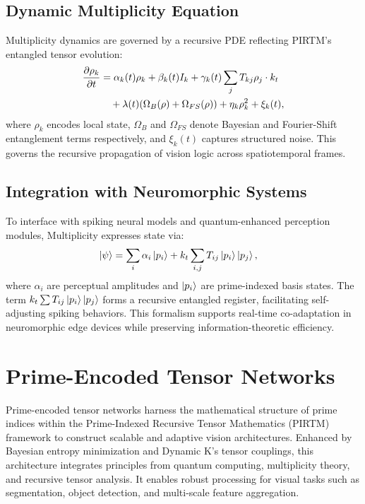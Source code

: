 \documentclass{article}
\theoremstyle{plain}
\begin{document}
\subsection{Dynamic Multiplicity Equation}
Multiplicity dynamics are governed by a recursive PDE reflecting PIRTM’s entangled tensor evolution:
\begin{align}
\frac{\partial \rho_k}{\partial t} &= \alpha_k(t) \rho_k + \beta_k(t) I_k + \gamma_k(t) \sum_j T_{kj} \rho_j \cdot k_t \notag \\
&\quad + \lambda(t)(\Omega_B(\rho) + \Omega_{FS}(\rho)) + \eta_k \rho_k^2 + \xi_k(t),
\end{align}
where \(\rho_k\) encodes local state, \(\Omega_B\) and \(\Omega_{FS}\) denote Bayesian and Fourier-Shift entanglement terms respectively, and \(\xi_k(t)\) captures structured noise. This governs the recursive propagation of vision logic across spatiotemporal frames.

\subsection{Integration with Neuromorphic Systems}
To interface with spiking neural models and quantum-enhanced perception modules, Multiplicity expresses state via:
\begin{align}
\ket{\psi} &= \sum_i \alpha_i \ket{p_i} + k_t \sum_{i,j} T_{ij} \ket{p_i} \ket{p_j},
\end{align}
where \(\alpha_i\) are perceptual amplitudes and \(\ket{p_i}\) are prime-indexed basis states. The term \(k_t \sum T_{ij} \ket{p_i} \ket{p_j}\) forms a recursive entangled register, facilitating self-adjusting spiking behaviors. This formalism supports real-time co-adaptation in neuromorphic edge devices while preserving information-theoretic efficiency.
\section{Prime-Encoded Tensor Networks}
Prime-encoded tensor networks harness the mathematical structure of prime indices within the Prime-Indexed Recursive Tensor Mathematics (PIRTM) framework to construct scalable and adaptive vision architectures. Enhanced by Bayesian entropy minimization and Dynamic K’s tensor couplings, this architecture integrates principles from quantum computing, multiplicity theory, and recursive tensor analysis. It enables robust processing for visual tasks such as segmentation, object detection, and multi-scale feature aggregation.
\end{document}
